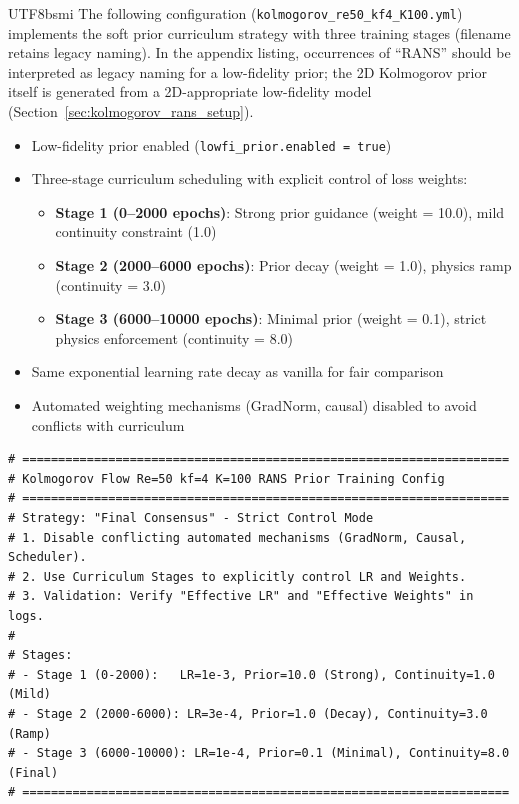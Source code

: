 \documentclass[master]{NTHUthesis}
\begin{document}
\begin{CJK*}{UTF8}{bsmi}
The following configuration (\texttt{kolmogorov\_re50\_kf4\_K100.yml}) implements the soft prior curriculum strategy with three training stages (filename retains legacy naming). In the appendix listing, occurrences of ``RANS'' should be interpreted as legacy naming for a low-fidelity prior; the 2D Kolmogorov prior itself is generated from a 2D-appropriate low-fidelity model (Section~\ref{sec:kolmogorov_rans_setup}).
\begin{itemize}
    \item Low-fidelity prior enabled (\texttt{lowfi\_prior.enabled = true})
    \item Three-stage curriculum scheduling with explicit control of loss weights:
    \begin{itemize}
        \item \textbf{Stage 1 (0--2000 epochs)}: Strong prior guidance (weight = 10.0), mild continuity constraint (1.0)
        \item \textbf{Stage 2 (2000--6000 epochs)}: Prior decay (weight = 1.0), physics ramp (continuity = 3.0)
        \item \textbf{Stage 3 (6000--10000 epochs)}: Minimal prior (weight = 0.1), strict physics enforcement (continuity = 8.0)
    \end{itemize}
    \item Same exponential learning rate decay as vanilla for fair comparison
    \item Automated weighting mechanisms (GradNorm, causal) disabled to avoid conflicts with curriculum
\end{itemize}

\begin{small}
\begin{lstlisting}[style=yamlStyle]
# ====================================================================
# Kolmogorov Flow Re=50 kf=4 K=100 RANS Prior Training Config
# ====================================================================
# Strategy: "Final Consensus" - Strict Control Mode
# 1. Disable conflicting automated mechanisms (GradNorm, Causal, Scheduler).
# 2. Use Curriculum Stages to explicitly control LR and Weights.
# 3. Validation: Verify "Effective LR" and "Effective Weights" in logs.
#
# Stages:
# - Stage 1 (0-2000):   LR=1e-3, Prior=10.0 (Strong), Continuity=1.0 (Mild)
# - Stage 2 (2000-6000): LR=3e-4, Prior=1.0 (Decay), Continuity=3.0 (Ramp)
# - Stage 3 (6000-10000): LR=1e-4, Prior=0.1 (Minimal), Continuity=8.0 (Final)
# ====================================================================


\end{lstlisting}
\end{small}
\end{CJK*}
\end{document}
